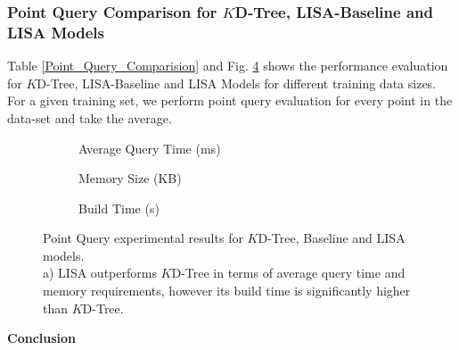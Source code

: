 \subsubsection{Point Query Comparison for $K$D-Tree, LISA-Baseline and LISA Models }
Table \ref{Point_Query_Comparision} and  Fig. \ref{fig:Point_Query_Comparision} shows the performance evaluation for $K$D-Tree, LISA-Baseline and LISA Models for different training data sizes. For a given training set, we perform point query evaluation for every point in the data-set and take the average. 

\begin{figure}
 \centering
     \begin{subfigure}[t]{0.32\textwidth}
         \centering
         
         \caption{Average Query Time (ms)}
         \label{fig:2d_exp2_1_1}
     \end{subfigure}
     \hfill
     \begin{subfigure}[t]{0.32\textwidth}
         \centering
         
         \caption{Memory Size (KB)}
         \label{fig:2d_exp2_1_2}
     \end{subfigure}
     \hfill
     \begin{subfigure}[t]{0.32\textwidth}
         \centering
         
         \caption{Build Time (s)}
         \label{fig:2d_exp2_1_3}
     \end{subfigure}
        \caption{Point Query experimental results for $K$D-Tree, Baseline and LISA models.\\ 
        a) LISA outperforms $K$D-Tree in terms of average query time and memory requirements, however its build time is significantly higher than $K$D-Tree.}
        \label{fig:Point_Query_Comparision}
\end{figure}
\textbf{Conclusion} 
